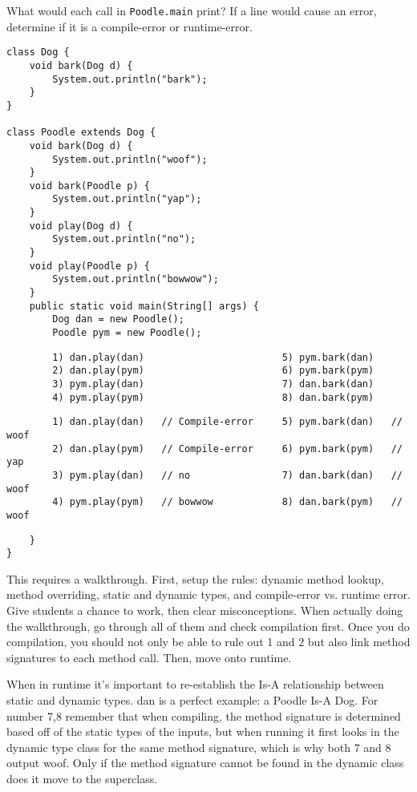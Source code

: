 \begin{blocksection}
\question What would each call in \lstinline$Poodle.main$ print? If a line
would cause an error, determine if it is a compile-error or runtime-error.

\begin{lstlisting}
class Dog {
    void bark(Dog d) {
        System.out.println("bark");
    }
}

class Poodle extends Dog {
    void bark(Dog d) {
        System.out.println("woof");
    }
    void bark(Poodle p) {
        System.out.println("yap");
    }
    void play(Dog d) {
        System.out.println("no");
    }
    void play(Poodle p) {
        System.out.println("bowwow");
    }
    public static void main(String[] args) {
        Dog dan = new Poodle();
        Poodle pym = new Poodle();
\end{lstlisting}
\ifprintanswers\else
\begin{lstlisting}
        1) dan.play(dan)                        5) pym.bark(dan)
        2) dan.play(pym)                        6) pym.bark(pym)
        3) pym.play(dan)                        7) dan.bark(dan)
        4) pym.play(pym)                        8) dan.bark(pym)
\end{lstlisting}
\fi
\begin{solution}
\begin{lstlisting}
        1) dan.play(dan)   // Compile-error     5) pym.bark(dan)   // woof
        2) dan.play(pym)   // Compile-error     6) pym.bark(pym)   // yap
        3) pym.play(dan)   // no                7) dan.bark(dan)   // woof
        4) pym.play(pym)   // bowwow            8) dan.bark(pym)   // woof
\end{lstlisting}
\end{solution}
\begin{lstlisting}
    }
}
\end{lstlisting}
\end{blocksection}

\begin{solution}

\begin{meta}
This requires a walkthrough. First, setup the rules: dynamic
method lookup, method overriding, static and dynamic types, and compile-error
vs. runtime error. Give students a chance to work, then clear misconceptions. When actually doing the walkthrough, go through all of them and check compilation first. Once you do compilation, you should not only be able to rule out 1 and 2 but also link method signatures to each method call. Then, move onto runtime. 

When in runtime it's important to re-establish the Is-A relationship between static and dynamic types. dan is a perfect example: a Poodle Is-A Dog. For number 7,8 remember that when compiling, the method signature is determined based off of the static types of the inputs, but when running it first looks in the dynamic type class for the same method signature, which is why both 7 and 8 output woof. Only if the method signature cannot be found in the dynamic class does it move to the superclass.
\end{meta}

\end{solution}
